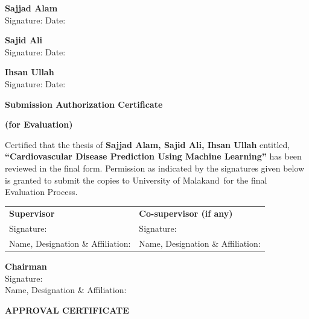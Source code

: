 \documentclass[12pt, a4paper, oneside]{book}
\newcommand{\thesistitle}{Cardiovascular Disease Prediction Using Machine Learning}
\newcommand{\thesisauthorA}{Sajjad Alam}
\newcommand{\thesisauthorB}{Sajid Ali}
\newcommand{\thesisauthorC}{Ihsan Ullah}
\newcommand{\thesisuni}{University of Malakand}
\begin{document}
\noindent \textbf{\thesisauthorA}\\
Signature: \hrulefill \quad Date: \hrulefill

\vspace{0.3in}
\noindent \textbf{\thesisauthorB}\\
Signature: \hrulefill \quad Date: \hrulefill

\vspace{0.3in}
\noindent \textbf{\thesisauthorC}\\
Signature: \hrulefill \quad Date: \hrulefill

\clearpage
\thispagestyle{plain}
\vspace*{0.5cm}
\begin{center}
{\fontsize{14pt}{16pt}\selectfont \textbf{Submission Authorization Certificate}\par}
\vspace{0.05in}
\vspace{0.2in}
{\fontsize{14pt}{16pt}\selectfont \textbf{(for Evaluation)}\par}
\end{center}
\vspace{0.4in}

\noindent Certified that the thesis of \textbf{\thesisauthorA, \thesisauthorB, \thesisauthorC} entitled, \textbf{``\thesistitle''} has been reviewed in the final form. Permission as indicated by the signatures given below is granted to submit the copies to \thesisuni\ for the final Evaluation Process.

\vspace{0.8in}

\noindent
\begin{tabular}{@{}p{}p{}@{}}
\textbf{Supervisor} & \textbf{Co-supervisor (if any)} \\
Signature: \hrulefill & Signature: \hrulefill \\
Name, Designation \& Affiliation: \hrulefill & Name, Designation \& Affiliation: \hrulefill
\end{tabular}

\vspace{0.6in}
\noindent \textbf{Chairman}\\
Signature: \hrulefill\\
Name, Designation \& Affiliation: \hrulefill

\clearpage
\thispagestyle{plain}
\vspace*{0.5cm}
\begin{center}
{\fontsize{14pt}{16pt}\selectfont \textbf{APPROVAL CERTIFICATE}\par}
\vspace{0.05in}
\vspace{0.2in}
\end{center}
\vspace{0.4in}
\end{document}
